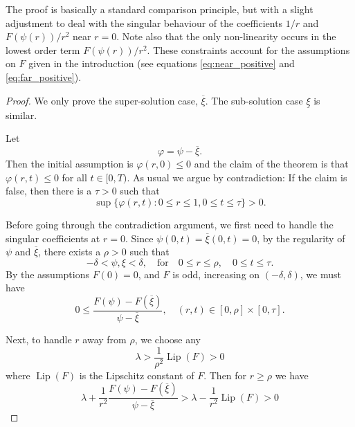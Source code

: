\documentclass{amsart}
\begin{document}
The proof is basically a standard comparison principle, but with a slight adjustment to deal with the singular behaviour of the coefficients \(1/r\) and \(F(\psi(r))/r^2\) near \(r=0\). Note also that the only non-linearity occurs in the lowest order term \(F(\psi(r))/r^2\). These constraints account for the assumptions on \(F\) given in the introduction (see equations \eqref{eq:near_positive} and \eqref{eq:far_positive}).

\begin{proof}
We only prove the super-solution case, \(\overline{\xi}\). The sub-solution case \(\underline{\xi}\) is similar.

Let
\[
\varphi = \psi - \overline{\xi}.
\]
Then the initial assumption is \(\varphi(r, 0) \leq 0\) and the claim of the theorem is that \(\varphi(r, t) \leq 0\) for all \(t \in [0, T)\). As usual we argue by contradiction: If the claim is false, then there is a \(\tau > 0\) such that
\begin{equation}
\label{eq:false_claim}
\sup \{\varphi(r, t) : 0 \leq r \leq 1, 0 \leq t \leq \tau\} > 0.
\end{equation}

Before going through the contradiction argument, we first need to handle the singular coefficients at \(r = 0\). Since \(\psi(0, t) = \overline{\xi}(0, t) = 0\), by the regularity of \(\psi\) and \(\overline{\xi}\), there exists a \(\rho > 0\) such that
\[
-\delta < \psi, \xi < \delta, \quad \text{for} \quad 0 \leq r \leq \rho, \quad 0 \leq t \leq \tau.
\]
By the assumptions \(F(0) = 0\), and \(F\) is odd, increasing on \((-\delta,\delta)\), we must have
\begin{equation}
\label{eq:near_positive}
0 \leq \frac{F(\psi) - F(\overline{\xi})}{\psi - \overline{\xi}}, \quad (r, t) \in [0, \rho] \times [0, \tau].
\end{equation}

Next, to handle \(r\) away from \(\rho\), we choose any
\[
\lambda > \frac{1}{\rho^2} \operatorname{Lip} (F) > 0
\]
where \(\operatorname{Lip} (F)\) is the Lipschitz constant of \(F\). Then for  \(r \geq \rho\) we have
\begin{equation}
\label{eq:far_positive}
\lambda + \frac{1}{r^2} \frac{F(\psi) - F(\overline{\xi})}{\psi - \overline{\xi}} > \lambda - \frac{1}{r^2} \operatorname{Lip} (F) > 0
\end{equation}


\end{proof}
\end{document}
